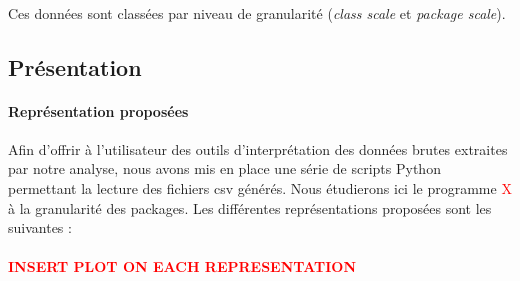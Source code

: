 \documentclass{scrartcl}
\newcommand{\TODO}[1] {
    \noindent \paragraph{\textcolor{red}{#1}}
}
\begin{document}
    \paragraph{}Ces données sont classées par niveau de granularité (\emph{class scale} et \emph{package scale}).

    \subsection{Présentation}

    \paragraph{Représentation proposées}Afin d'offrir à l'utilisateur des outils d'interprétation des données brutes extraites par notre analyse, nous avons mis en place une série de scripts Python permettant la lecture des fichiers csv générés. Nous étudierons ici le programme \textcolor{red}{X} à la granularité des packages. Les différentes représentations proposées sont les suivantes :
    \TODO{INSERT PLOT ON EACH REPRESENTATION}
\end{document}
